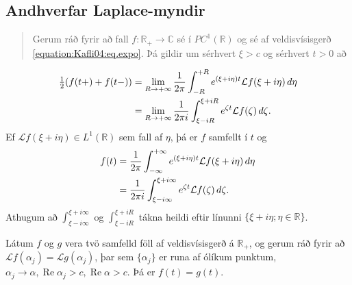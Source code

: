 \documentclass[a4paper,10pt,icelandic]{sphinxmanual}
\begin{document}
\subsection{Andhverfar Laplace-myndir}
\label{\detokenize{Kafli04:andhverfar-laplace-myndir}}\label{\detokenize{Kafli04:fouriermellin}}
\begin{quote}

Gerum ráð fyrir að fall \(f:{{\mathbb R}}_+\to {{\mathbb C}}\) sé í \(PC^1 (\mathbb R)\) og sé af veldisvísisgerð \eqref{equation:Kafli04:eq.expo}. Þá gildir  um sérhvert \(\xi> c\) og sérhvert \(t> 0\) að
\end{quote}
\begin{equation*}
\begin{split}\begin{aligned}
\label{7.2.2}
\tfrac 12(f(t+)+f(t-))& = \lim_{R\to +\infty} \dfrac 1{2\pi}
\int_{-R}^{+R}e^{(\xi+i\eta)t}{{\cal L}}f(\xi+i\eta) \, d\eta \\
&= \lim_{R\to +\infty} \dfrac 1{2\pi i}
\int_{\xi-iR}^{\xi+iR}e^{\zeta t}{{\cal L}}f(\zeta) \, d\zeta. \nonumber\end{aligned}\end{split}
\end{equation*}
Ef \(\mathcal{L} f(\xi+i \eta)\in L^1(\mathbb R)\) sem fall af \(\eta\), þá er \(f\) samfellt í \(t\) og
\begin{equation*}
\begin{split}\begin{aligned}
f(t)&=  \dfrac 1{2\pi}
\int_{-\infty}^{+\infty}e^{(\xi+i\eta)t}{{\cal L}}f(\xi+i\eta) \, d\eta
\\
&= \dfrac 1{2\pi i}
\int_{\xi-i\infty}^{\xi+i\infty}e^{\zeta t}{{\cal L}}f(\zeta) \,
d\zeta. \nonumber\end{aligned}\end{split}
\end{equation*}
Athugum að \(\int_{\xi-i\infty}^{\xi+i\infty}\) og \(\int_{\xi-iR}^{\xi+iR}\) tákna heildi eftir línunni \(\{\xi+i \eta; \eta \in \mathbb{R}\}\).


Látum \(f\) og \(g\) vera tvö samfelld föll af veldisvísisgerð á \(\mathbb{R_+}\), og gerum ráð fyrir að \(\mathcal{L}f(\alpha_j)=\mathcal{L}g(\alpha_j)\), þar sem \(\{\alpha_j\}\) er runa af ólíkum punktum, \(\alpha_j\to\alpha, \operatorname{Re}\alpha_j>c, \operatorname{Re}\alpha>c\). Þá er \(f(t)=g(t)\).
\end{document}
